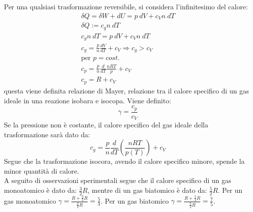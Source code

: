 \documentclass{article}
\numberwithin{equation}{subsection}
\begin{document}
\begin{center}\end{center}

Per una qualsiasi trasformazione reversibile, si considera 
l'infinitesimo del calore:
\begin{gather}
    \delta Q=\delta W+dU=p\:dV+c_Vn\:dT\\
    \delta Q :=c_gn\:dT\\
    c_gn\:dT=p\:dV+c_Vn\:dT\\
    c_g=\displaystyle\frac{p}{n}\frac{dV}{dT}+c_V\Rightarrow c_g>c_V\\
    \mbox{per }p=cost.\\
    c_p=\displaystyle\frac{p}{n}\frac{d}{dT}\frac{nRT}{p}+c_V\\
    c_p=R+c_V
\end{gather}
questa viene definita relazione di Mayer, relazione tra il 
calore specifico di un gas ideale in una reazione isobara e 
isocopa. Viene definito:
\begin{equation}
    \gamma=\displaystyle\frac{c_p}{c_V}
\end{equation}
Se la pressione non è costante, il calore specifico del gas 
ideale della trasformazione sarà dato da:
\begin{equation}
    c_g=\displaystyle\frac{p}{n}\frac{d}{dT}\left(\frac{nRT}{p(T)}\right)+c_V
\end{equation}
Segue che la trasformazione isocora, avendo il calore specifico 
minore, spende la minor quantità di calore. \\
A seguito di osservazioni sperimentali segue che il calore 
specifico di un gas monoatomico è dato da: $\displaystyle\frac{3}{2}R$, 
mentre di un gas biatomico è dato da: $\displaystyle\frac{5}{2}R$. 
Per un gas monoatomico $\gamma=\displaystyle\frac{R+\frac{3}{2}R}{\frac{3}{2}R}=\frac{5}{3}$. 
Per un gas biatomico $\gamma=\displaystyle\frac{R+\frac{5}{2}R}{\frac{5}{2}R}=\frac{7}{5}$.\\
\end{document}
